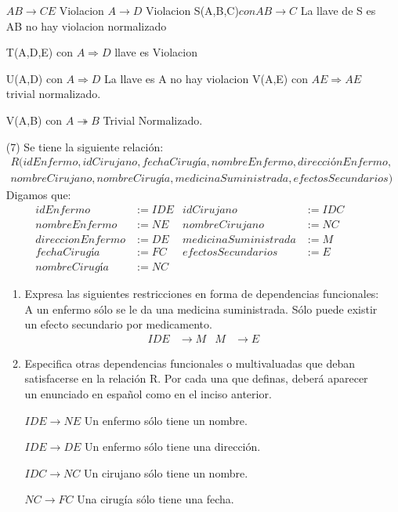 \documentclass{article}
\begin{document}
\begin{enumerate}
    $AB \rightarrow CE$ Violacion
    $A \rightarrow D$ Violacion
    S(A,B,C)$ con AB\rightarrow C$ La llave de S es AB no hay violacion normalizado

    T(A,D,E) con $A\Rightarrow D$ llave es Violacion
    
    U(A,D) con $A \Rightarrow D$ La llave es A no hay violacion
    V(A,E) con $AE \Rightarrow AE$ trivial normalizado.


    V(A,B) con $A \twoheadrightarrow B$ Trivial Normalizado.
    \item[(7)] Se tiene la siguiente relación:
    \begin{multline*}
      R(idEnfermo,idCirujano,fechaCirugía,nombreEnfermo,direcciónEnfermo, \\
      nombreCirujano,nombreCirugía,medicinaSuministrada,efectosSecundarios)
    \end{multline*}
    Digamos que:
    \begin{align*}
      idEnfermo &:= IDE & idCirujano &:= IDC \\
      nombreEnfermo &:= NE & nombreCirujano &:= NC  \\
      direccionEnfermo &:= DE & medicinaSuministrada &:= M & \\
      fechaCirugía &:= FC & efectosSecundarios &:= E \\
      nombreCirugía &:= NC
    \end{align*}
    \begin{enumerate}
      \item Expresa las siguientes restricciones en forma de dependencias
      funcionales: A un enfermo sólo se le da una medicina suministrada. Sólo
      puede existir un efecto secundario por medicamento.
      \begin{align*}
        IDE &\rightarrow M  & M &\rightarrow E
      \end{align*}
      \item Especifica otras dependencias funcionales o multivaluadas que deban
      satisfacerse en la relación R. Por cada una que definas, deberá aparecer
      un enunciado en español como en el inciso anterior.

        $IDE \rightarrow NE$ Un enfermo sólo tiene un nombre.

        $IDE \rightarrow DE$ Un enfermo sólo tiene una dirección.

        $IDC \rightarrow NC$ Un cirujano sólo tiene un nombre.

        $NC \rightarrow FC$ Una cirugía sólo tiene una fecha.


\end{enumerate}
\end{enumerate}
\end{document}
